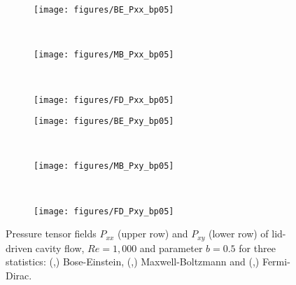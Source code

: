 \documentclass[aip,jmp,amsmath,amssymb,reprint,noshowpacs]{revtex4-1}
\begin{document}
\begin{figure*}[ht]
\centering
        \begin{subfigure}[b]{0.3\textwidth}
                \centering
                \texttt{[image: figures/BE\_Pxx\_bp05]}
                \caption{ }
                \label{fig:BE_Pxx_bp05}
        \end{subfigure}%
				~
				\begin{subfigure}[b]{0.3\textwidth}
                \centering
                \texttt{[image: figures/MB\_Pxx\_bp05]}
                \caption{ }
                \label{fig:MB_Pxx_bp05}
        \end{subfigure}%
				~
				\begin{subfigure}[b]{0.3\textwidth}
                \centering
                \texttt{[image: figures/FD\_Pxx\_bp05]}
                \caption{ }
                \label{fig:FD_Pxx_bp05}
        \end{subfigure}%
				
				\begin{subfigure}[b]{0.3\textwidth}
                \centering
                \texttt{[image: figures/BE\_Pxy\_bp05]}
                \caption{ }
                \label{fig:BE_Pxy_bp05}
        \end{subfigure}%
				~
				\begin{subfigure}[b]{0.3\textwidth}
                \centering
                \texttt{[image: figures/MB\_Pxy\_bp05]}
                \caption{ }
                \label{fig:MB_Pxy_bp05}
        \end{subfigure}%
				~
				\begin{subfigure}[b]{0.3\textwidth}
                \centering
                \texttt{[image: figures/FD\_Pxy\_bp05]}
                \caption{ }
                \label{fig:FD_Pxy_bp05}
        \end{subfigure}%
	\caption{Pressure tensor fields $P_{xx}$ (upper row) and $P_{xy}$ (lower row) of lid-driven cavity flow, $Re=1,000$ and parameter $b=0.5$ for three statistics:
	(,) Bose-Einstein, (,) Maxwell-Boltzmann and
 	(,) Fermi-Dirac.}
	\label{fig:Pressure_Tensor_bp05}
\end{figure*}
\end{document}

